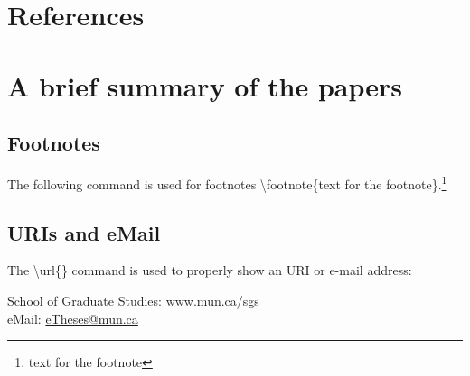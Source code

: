 \documentclass[12pt]{cls}
\begin{document}
\section{References}
\section{A brief summary of the papers}

\subsection{Footnotes}
The following command is used for footnotes \textbackslash footnote\{text for the footnote\}.\footnote{text for the footnote}

\subsection{URIs and eMail}
The \textbackslash url\{\} command is used to properly show an URI or e-mail address:

School of Graduate Studies: \url{www.mun.ca/sgs}\\
eMail: \url{eTheses@mun.ca}


\cleardoublepage

 
\end{document}
